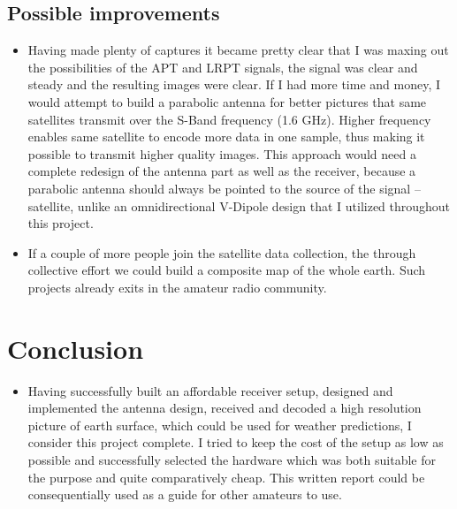 \documentclass{article}
\begin{document}
    \subsection{Possible improvements}
        \begin{itemize}
            \item[] Having made plenty of captures it became pretty clear that I was maxing out the possibilities of the APT and LRPT signals, the signal was clear and steady and the resulting images were clear. If I had more time and money, I would attempt to build a parabolic antenna for better pictures that same satellites transmit over the S-Band frequency (1.6 GHz). Higher frequency enables same satellite to encode more data in one sample, thus making it possible to transmit higher quality images. This approach would need a complete redesign of the antenna part as well as the receiver, because a parabolic antenna should always be pointed to the source of the signal -- satellite, unlike an omnidirectional V-Dipole design that I utilized throughout this project.
            \item[] If a couple of more people join the satellite data collection, the through collective effort we could build a composite map of the whole earth. Such projects already exits in the amateur radio community.
        \end{itemize}

\section{Conclusion}
    \begin{itemize}
        \item[] Having successfully built an affordable receiver setup, designed and implemented the antenna design, received and decoded a high resolution picture of earth surface, which could be used for weather predictions, I consider this project complete. I tried to keep the cost of the setup as low as possible and successfully selected the hardware which was both suitable for the purpose and quite comparatively cheap. This written report could be consequentially used as a guide for other amateurs to use. 
    \end{itemize}
    
\newpage
\end{document}
